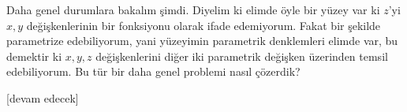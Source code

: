 \documentclass[12pt,fleqn]{article}\usepackage{../../common}
\begin{document}
Daha genel durumlara bakalım şimdi. Diyelim ki elimde öyle bir yüzey var ki
$z$'yi $x,y$ değişkenlerinin bir fonksiyonu olarak ifade edemiyorum. Fakat
bir şekilde parametrize edebiliyorum, yani yüzeyimin parametrik denklemleri
elimde var, bu demektir ki $x,y,z$ değişkenlerini diğer iki parametrik değişken
üzerinden temsil edebiliyorum. Bu tür bir daha genel problemi nasıl çözerdik?

















[devam edecek]
\end{document}
